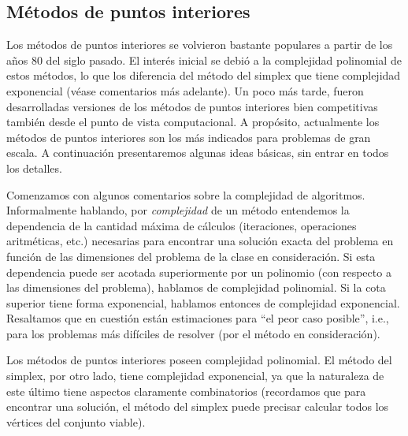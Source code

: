 
\subsection{Métodos de puntos interiores}
\label{v2:sec:6.1.3}

Los métodos de puntos interiores se volvieron bastante populares a partir de los años 80 del siglo pasado. El interés inicial se debió a la complejidad polinomial de estos métodos, lo que los diferencia del método del simplex que tiene complejidad exponencial (véase comentarios más adelante). Un poco más tarde, fueron desarrolladas versiones de los métodos de puntos interiores bien competitivas también desde el punto de vista computacional. A propósito, actualmente los métodos de puntos interiores son los más indicados para problemas de gran escala. A continuación presentaremos algunas ideas básicas, sin entrar en todos los detalles.

Comenzamos con algunos comentarios sobre la complejidad de algoritmos. Informalmente hablando, por \textit{complejidad} de un método entendemos la dependencia de la cantidad máxima de cálculos (iteraciones, operaciones aritméticas, etc.) necesarias para encontrar una solución exacta del problema en función de las dimensiones del problema de la clase en consideración. Si esta dependencia puede ser acotada superiormente por un polinomio (con respecto a las dimensiones del problema), hablamos de complejidad polinomial. Si la cota superior tiene forma exponencial, hablamos entonces de complejidad exponencial. Resaltamos que en cuestión están estimaciones para ``el peor caso posible'', i.e., para los problemas más difíciles de resolver (por el método en consideración).

Los métodos de puntos interiores poseen complejidad polinomial. El método del simplex, por otro lado, tiene complejidad exponencial, ya que la naturaleza de este último tiene aspectos claramente combinatorios (recordamos que para encontrar una solución, el método del simplex puede precisar calcular todos los vértices del conjunto viable).

